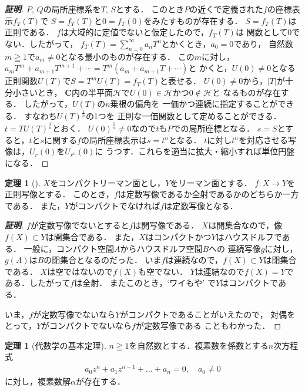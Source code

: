 \documentclass[11pt, a4paper, dvipdfmx, draft]{jsarticle}
\theoremstyle{definition}
\newtheorem{Theorem}[Axiom]{定理}
\newcommand{\cc}{\mathbf{C}}
\theoremstyle{mystyle}
\numberwithin{equation}{section} %
\begin{document}
\begin{proof}[\bf{証明}]
    $P$, $Q$の局所座標系を$T$, $S$とする．
    このとき$P$の近くで定義された$f$の座標表示$f_T(T)$で
    $S=f_T(T)$と$0=f_T(0)$をみたすものが存在する．
    $S=f_T(T)$は正則である．
    $f$は大域的に定値でないと仮定したので，$f_T(T)$は
    関数として$0$でない．したがって，
    $f_T(T)=\sum_{n=0}^{\infty}a_nT^n$とかくとき，$a_0=0$であり，
    自然数$m\geqq1$で$a_m\neq0$となる最小のものが存在する．
    この$m$に対し，
    $a_mT^m+a_{m+1}T^{m+1}+\cdots=T^m(a_m+a_{m+1}T+\cdots)$と
    かくと，$U(0)\neq0$となる
    正則関数$U(T)$で$S=T^mU(T)=f_T(T)$と表せる．
    $U(0)\neq0$から，$|T|$が十分小さいとき，
    \newcommand{\hpln}{\mathcal{H}}
    $\cc$内の半平面$\hpln$で$U(0)\in\hpln$かつ$0\not\in\hpln$と
    なるものが存在する．
    したがって，$U(T)$の$n$乗根の偏角を
    一価かつ連続に指定することができる．
    すなわち$U(T)^{\frac{1}{n}}$の1つを
    正則な一価関数として定めることができる．
    $t=TU(T)^{\frac{1}{n}}$とおく．
    $U(0)^{\frac{1}{n}}\neq0$なので$t$も$P$での局所座標となる．
    $s=S$とすると，$t$と$s$に関する$f$の局所座標表示は$s=t^n$となる．
    $t$に対し$t^n$を対応させる写像は，$U_r(0)$を$U_{r^n}(0)$に
    うつす．これらを適当に拡大・縮小すれば単位円盤になる．
\end{proof}

\begin{Theorem}[{\cite[定理2.22]{ogs}}]
    $X$をコンパクトリーマン面とし，$Y$をリーマン面とする．
    $f\colon X\to Y$を正則写像とする．
    このとき，$f$は定数写像であるか全射であるかのどちらか一方である．
    また，$Y$がコンパクトでなければ$f$は定数写像となる．
\end{Theorem}

\begin{proof}[\bf{証明}]
    $f$が定数写像でないとすると$f$は開写像である．
    $X$は開集合なので，像$f(X)\subset Y$は開集合である．
    また，$X$はコンパクトかつ$Y$はハウスドルフである．
    一般に，コンパクト空間$A$からハウスドルフ空間$B$への
    連続写像$g$に対し，$g(A)$は$B$の閉集合となるのだった．
    いま$f$は連続なので，$f(X)\subset Y$は閉集合である．
    $X$は空ではないので$f(X)$も空でない．
    $Y$は連結なので$f(X)=Y$である．したがって$f$は全射．
    またこのとき，`ワイもや' で$Y$はコンパクトである．

    いま，$f$が定数写像でないなら$Y$がコンパクトであることがいえたので，
    対偶をとって，$Y$がコンパクトでないなら$f$が定数写像である
    こともわかった．
\end{proof}

\begin{Theorem}[代数学の基本定理{\cite[系2.24]{ogs}}]
    $n\geqq1$を自然数とする．複素数を係数とする$n$次方程式
    \begin{align}
        a_{0}z^{n}+a_{1}z^{n-1}+\dots +a_{n}=0,\quad a_{0}\neq 0 \label{eq:thmAlg}
    \end{align}
    に対し，複素数解$\alpha$が存在する．
\end{Theorem}
\end{document}
